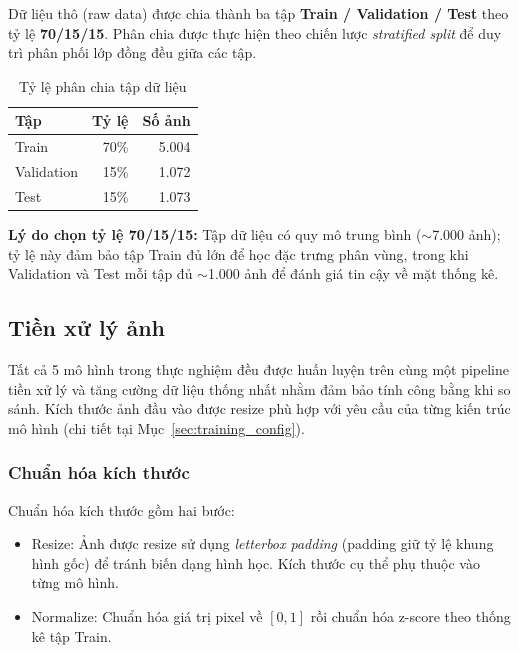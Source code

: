 Dữ liệu thô (raw data) được chia thành ba tập \textbf{Train / Validation / Test} theo tỷ lệ \textbf{70/15/15}. Phân chia được thực hiện theo chiến lược \emph{stratified split} để duy trì phân phối lớp đồng đều giữa các tập.

\begin{table}[H]
    \caption{Tỷ lệ phân chia tập dữ liệu}
    \centering
    \begin{tabular}{lrr}
        \toprule
        \textbf{Tập} & \textbf{Tỷ lệ} & \textbf{Số ảnh} \\
        \midrule
        Train        & 70\%           & 5.004           \\
        Validation   & 15\%           & 1.072           \\
        Test         & 15\%           & 1.073           \\
        \bottomrule
    \end{tabular}
    \label{tab:split}
\end{table}

\textbf{Lý do chọn tỷ lệ 70/15/15:} Tập dữ liệu có quy mô trung bình ($\sim$7.000 ảnh); tỷ lệ này đảm bảo tập Train đủ lớn để học đặc trưng phân vùng, trong khi Validation và Test mỗi tập đủ $\sim$1.000 ảnh để đánh giá tin cậy về mặt thống kê.

\subsection{Tiền xử lý ảnh}

Tất cả 5 mô hình trong thực nghiệm đều được huấn luyện trên cùng một pipeline tiền xử lý và tăng cường dữ liệu thống nhất nhằm đảm bảo tính công bằng khi so sánh. Kích thước ảnh đầu vào được resize phù hợp với yêu cầu của từng kiến trúc mô hình (chi tiết tại Mục~\ref{sec:training_config}).

\subsubsection{Chuẩn hóa kích thước}
Chuẩn hóa kích thước gồm hai bước:
\begin{itemize}
    \item Resize: Ảnh được resize sử dụng \emph{letterbox padding} (padding giữ tỷ lệ khung hình gốc) để tránh biến dạng hình học. Kích thước cụ thể phụ thuộc vào từng mô hình.
    \item Normalize: Chuẩn hóa giá trị pixel về $[0, 1]$ rồi chuẩn hóa z-score theo thống kê tập Train.
\end{itemize}


